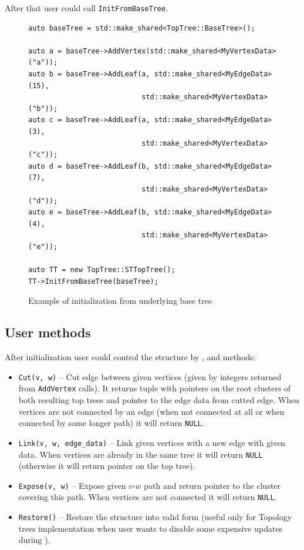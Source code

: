 After that user could call \texttt{InitFromBaseTree}.

\begin{figure}[H]
\begin{verbatim}
auto baseTree = std::make_shared<TopTree::BaseTree>();

auto a = baseTree->AddVertex(std::make_shared<MyVertexData>("a"));
auto b = baseTree->AddLeaf(a, std::make_shared<MyEdgeData>(15),
                           std::make_shared<MyVertexData>("b"));
auto c = baseTree->AddLeaf(a, std::make_shared<MyEdgeData>(3),
                           std::make_shared<MyVertexData>("c"));
auto d = baseTree->AddLeaf(b, std::make_shared<MyEdgeData>(7),
                           std::make_shared<MyVertexData>("d"));
auto e = baseTree->AddLeaf(b, std::make_shared<MyEdgeData>(4),
                           std::make_shared<MyVertexData>("e"));

auto TT = new TopTree::STTopTree();
TT->InitFromBaseTree(baseTree);
\end{verbatim}
\caption{Example of initialization from underlying base tree}
\label{verb:example_init}
\end{figure}

\subsection{User methods}

After initialization user could control the structure by \Link, \Cut{} and \Expose{}
methods:
\begin{itemize}

\item \texttt{Cut(v, w)} -- Cut edge between given vertices (given by integers
returned from \texttt{AddVertex} calls). It returns tuple with pointers on the
root clusters of both resulting top trees and pointer to the edge data from
cutted edge. When vertices are not connected by an edge (when not connected at
all or when connected by some longer path) it will return \texttt{NULL}.

\item \texttt{Link(v, w, edge\_data)} -- Link given vertices with a new edge
with given data. When vertices are already in the same tree it will
return \texttt{NULL} (otherwise it will return pointer on the top tree).

\item \texttt{Expose(v, w)} -- Expose given $v$-$w$ path and return pointer to
the cluster covering this path. When vertices are not connected it will return
\texttt{NULL}.

\item \texttt{Restore()} -- Restore the structure into valid form (useful only
for Topology trees implementation when user wants to disable some expensive
updates during \Expose).

\end{itemize}

